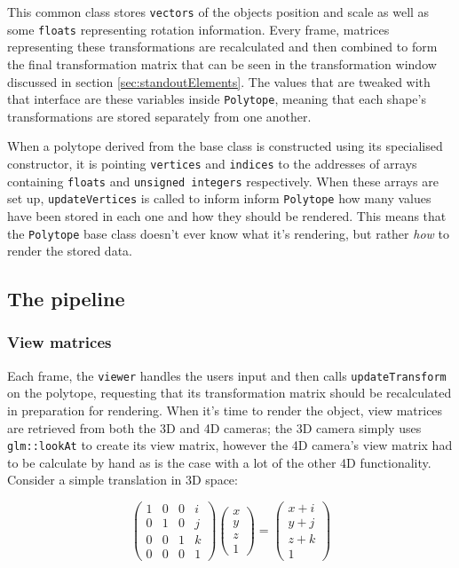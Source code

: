 \documentclass[11pt, a4paper]{article}
\begin{document}
This common class stores \texttt{vectors} of the objects position and scale as well as some \texttt{floats} representing rotation information. Every frame, matrices representing these transformations are recalculated and then combined to form the final transformation matrix that can be seen in the transformation window discussed in section \ref{sec:standoutElements}. The values that are tweaked with that interface are these variables inside \texttt{Polytope}, meaning that each shape's transformations are stored separately from one another.

When a polytope derived from the base class is constructed using its specialised constructor, it is pointing \texttt{vertices} and \texttt{indices} to the addresses of arrays containing \texttt{floats} and \texttt{unsigned integers} respectively. When these arrays are set up, \texttt{updateVertices} is called to inform inform \texttt{Polytope} how many values have been stored in each one and how they should be rendered. This means that the \texttt{Polytope} base class doesn't ever know what it's rendering, but rather \emph{how} to render the stored data.

\subsection{The pipeline}
\subsubsection{View matrices}
\label{subsubsec:viewMatrices}

Each frame, the \texttt{viewer} handles the users input and then calls \texttt{updateTransform} on the polytope, requesting that its transformation matrix should be recalculated in preparation for rendering. When it's time to render the object, view matrices are retrieved from both the 3D and 4D cameras; the 3D camera simply uses \texttt{glm::lookAt} to create its view matrix, however the 4D camera's view matrix had to be calculate by hand as is the case with a lot of the other 4D functionality. Consider a simple translation in 3D space:

\begin{equation*}
  \begin{pmatrix}
  1 & 0 & 0 & i \\
  0 & 1 & 0 & j \\
  0 & 0 & 1 & k \\
  0 & 0 & 0 & 1
  \end{pmatrix}
  \begin{pmatrix}
    x \\
    y \\
    z \\
    1
  \end{pmatrix}
  =
  \begin{pmatrix}
    x + i \\
    y + j \\
    z + k \\
    1
  \end{pmatrix}
\end{equation*}
\end{document}

